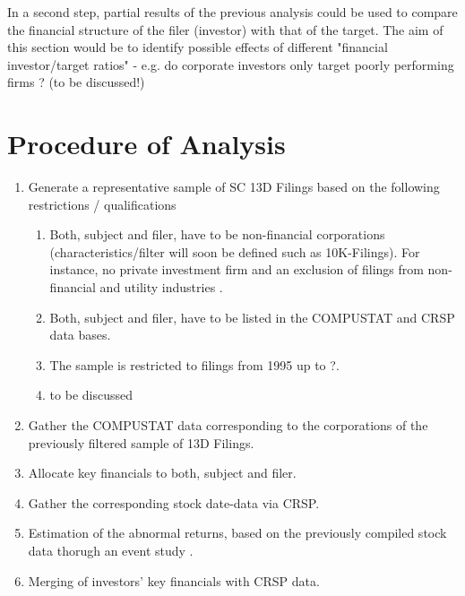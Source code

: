 \documentclass[12pt]{article}
\begin{document}
In a second step, partial results of the previous analysis could be used to compare the financial structure of the filer (investor) with that of the target. The aim of this section would be to identify possible effects of different "financial investor/target ratios" - e.g. do corporate investors only target poorly performing firms \citep{Klein2009}? (to be discussed!)

\section{Procedure of Analysis}

\begin{enumerate}
\item Generate a representative sample of SC 13D Filings based on the following restrictions / qualifications
	
	\begin{enumerate}
	\item Both, subject and filer, have to be non-financial corporations (characteristics/filter will soon be defined such as 10K-Filings). For instance, no private investment firm and an exclusion of filings from non-financial and utility industries \citep{Brigida2012}.
 	\item Both, subject and filer, have to be listed in the COMPUSTAT and CRSP data bases.
	\item The sample is restricted to filings from 1995 up to ?.
	\item to be discussed
	\end{enumerate}
	
\item Gather the COMPUSTAT data corresponding to the corporations of the previously filtered sample of 13D Filings.
\item Allocate key financials to both, subject and filer.
\item Gather the corresponding stock date-data via CRSP.
\item Estimation of the abnormal returns, based on the previously compiled stock data thorugh an event study \citep{ang2011} \citep{Fama1992} \citep{Kolari2010}. 
\item Merging of investors' key financials with CRSP data.

\end{enumerate}

\pagebreak
\printbibliography[title=Relevant Literature]
\end{document}
